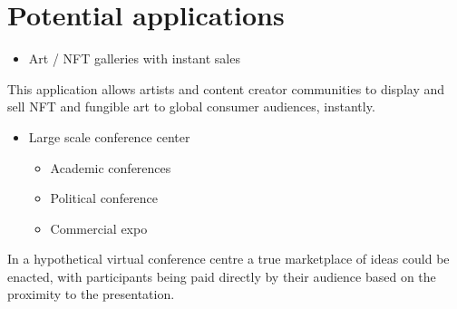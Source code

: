 \section{Potential applications }
\begin{itemize}
\item Art / NFT galleries with instant sales
\end{itemize}

This application allows artists and content creator communities to
display and sell NFT and fungible art to global consumer audiences,
instantly.

\begin{itemize}
\item
  Large scale conference center

  \begin{itemize}
  \item
    Academic conferences
  \item
    Political conference
  \item
    Commercial expo
  \end{itemize}
\end{itemize}

In a hypothetical virtual conference centre a true marketplace of ideas
could be enacted, with participants being paid directly by their
audience based on the proximity to the presentation.

